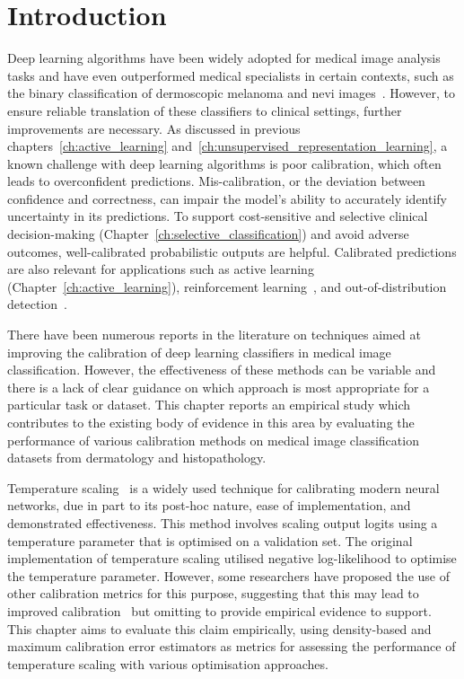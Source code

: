 \section{Introduction}
\label{sec:calibration_introduction}
Deep learning algorithms have been widely adopted for medical image analysis tasks and have even outperformed medical specialists in certain contexts, such as the binary classification of dermoscopic melanoma and nevi images~\citep{maron2019systematic}. However, to ensure reliable translation of these classifiers to clinical settings, further improvements are necessary. As discussed in previous chapters~\ref{ch:active_learning} and~\ref{ch:unsupervised_representation_learning}, a known challenge with deep learning algorithms is poor calibration, which often leads to overconfident predictions. Mis-calibration, or the deviation between confidence and correctness, can impair the model's ability to accurately identify uncertainty in its predictions. To support cost-sensitive and selective clinical decision-making (Chapter~\ref{ch:selective_classification}) and avoid adverse outcomes, well-calibrated probabilistic outputs are helpful. Calibrated predictions are also relevant for applications such as active learning (Chapter~\ref{ch:active_learning}), reinforcement learning~\citep{dai2020federated}, and out-of-distribution detection~\citep{ulmer2020trust}.

There have been numerous reports in the literature on techniques aimed at improving the calibration of deep learning classifiers in medical image classification. However, the effectiveness of these methods can be variable and there is a lack of clear guidance on which approach is most appropriate for a particular task or dataset. This chapter reports an empirical study which contributes to the existing body of evidence in this area by evaluating the performance of various calibration methods on medical image classification datasets from dermatology and histopathology.

Temperature scaling~\citep{guo2017calibration} is a widely used technique for calibrating modern neural networks, due in part to its post-hoc nature, ease of implementation, and demonstrated effectiveness. This method involves scaling output logits using a temperature parameter that is optimised on a validation set. The original implementation of temperature scaling utilised negative log-likelihood to optimise the temperature parameter. However, some researchers have proposed the use of other calibration metrics for this purpose, suggesting that this may lead to improved calibration~\citep{mukhoti2020calibrating,frenkel2021network} but omitting to provide empirical evidence to support. This chapter aims to evaluate this claim empirically, using density-based and maximum calibration error estimators as metrics for assessing the performance of temperature scaling with various optimisation approaches.

